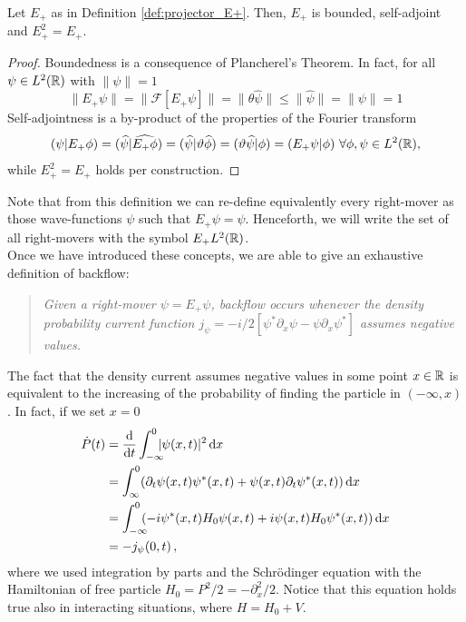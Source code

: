 \begin{prop}
	Let $E_+$ as in Definition \ref{def:projector_E+}. Then, $E_+$ is bounded, self-adjoint and $E_+^2=E_+$.
\end{prop}
\begin{proof}
	Boundedness is a consequence of Plancherel's Theorem. In fact, for all $\psi\in L^2({\mathbb R})$ with $\|\psi\|=1$
	\begin{equation}
		\|E_+\psi\|=\|\mathcal{F}[E_+\psi]\|=\|\theta\hat{\psi}\|\le\|\hat{\psi}\|=\|\psi\|=1
	\end{equation}
	Self-adjointness is a by-product of the properties of the Fourier transform
	\begin{equation}
		(\psi|E_+\phi)=(\widehat{\psi}|\widehat{E_+\phi})=(\widehat{\psi}|\vartheta\widehat{\phi})
		=(\vartheta\widehat{\psi}|\phi)=(E_+\psi|\phi)\ \forall \phi,\psi\in L^2({\mathbb R}),
	\end{equation}
	while $E_+^2=E_+$ holds per construction.
\end{proof}

Note that from this definition we can re-define equivalently every right-mover as those wave-functions $\psi$ such that $E_+\psi=\psi$. Henceforth, we will write the set of all right-movers with the symbol $E_+L^2({\mathbb R})$.\\
 Once we have introduced these concepts, we are able to give an exhaustive definition of backflow:
\begin{verse}
	\centering
	\emph{Given a right-mover $\psi=E_+\psi$, backflow occurs whenever the density probability current function $j_\psi=-i/2[\psi^*\partial_x\psi-\psi\partial_x\psi^*]$ assumes negative values.}
\end{verse}
\begin{oss}
The fact that the density current assumes negative values in some point $x\in{\mathbb R}$ is equivalent to the increasing of the probability of finding the particle in $(-\infty,x)$. In fact, if we set $x=0$
\begin{equation}
\begin{aligned}
\dot{P}(t)&=\frac{\mathrm d}{\mathrm d t}\int_{-\infty}^{0}\!\!\!\!|\psi(x,t)|^2\, \mathrm d x\\
&=\int_{\infty}^{0}(\partial_t\psi(x,t)\psi^*(x,t)+\psi(x,t)\partial_t\psi^*(x,t))\, \mathrm d x\\
&= \int_{-\infty}^{0}\!\!\!(-i\psi^*(x,t)H_0\psi(x,t)+i\psi(x,t)H_0\psi^*(x,t))\, \mathrm d x\\
&=-j_\psi(0,t)\,,
\end{aligned}
\end{equation}
where we used integration by parts and the Schr\"{o}dinger equation with the Hamiltonian of free particle $H_0=P^2/2=-\partial_x^2/2$. Notice that this equation holds true also in interacting situations, where $H=H_0+V$.
\end{oss}

